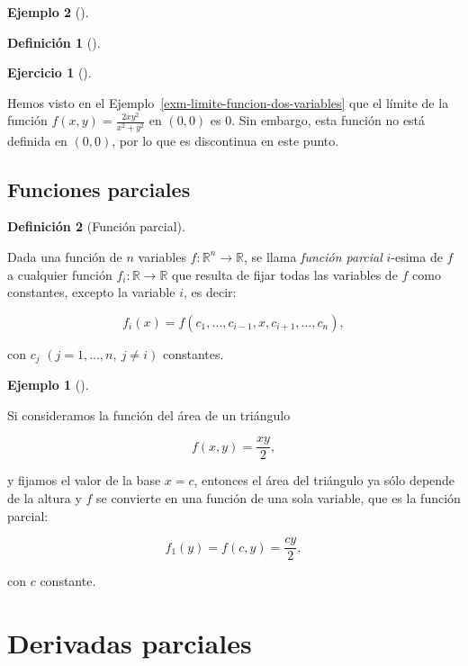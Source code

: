 \documentclass[
  a4paper,
]{scrreport}
\theoremstyle{definition}
\newtheorem{example}{Ejemplo}[chapter]
\theoremstyle{plain}
\theoremstyle{definition}
\newtheorem{definition}{Definición}[chapter]
\theoremstyle{definition}
\newtheorem{exercise}{Ejercicio}[chapter]
\theoremstyle{plain}
\theoremstyle{plain}
\theoremstyle{remark}
\begin{document}
\begin{example}[]
\begin{definition}[]
\end{definition}

\begin{exercise}[]\protect\hypertarget{exr-funcion-varias-variables-discontinua}{}\label{exr-funcion-varias-variables-discontinua}

Hemos visto en el Ejemplo~\ref{exm-limite-funcion-dos-variables} que el
límite de la función \(f(x,y)=\frac{2xy^2}{x^2+y^2}\) en \((0,0)\) es
\(0\). Sin embargo, esta función no está definida en \((0,0)\), por lo
que es discontinua en este punto.

\end{exercise}

\subsection{Funciones parciales}\label{funciones-parciales}

\begin{definition}[Función
parcial]\protect\hypertarget{def-funcion-parcial}{}\label{def-funcion-parcial}

Dada una función de \(n\) variables
\(f:\mathbb{R}^n\rightarrow \mathbb{R}\), se llama \emph{función
parcial} \(i\)-esima de \(f\) a cualquier función
\(f_i:\mathbb{R}\rightarrow \mathbb{R}\) que resulta de fijar todas las
variables de \(f\) como constantes, excepto la variable \(i\), es decir:

\[f_i(x)=f(c_1,\ldots,c_{i-1},x,c_{i+1},\ldots,c_{n}),\]

con \(c_j\) \((j=1,\ldots, n,\ j\neq i)\) constantes.

\end{definition}

\begin{example}[]\protect\hypertarget{exm-funcion-parcial}{}\label{exm-funcion-parcial}

Si consideramos la función del área de un triángulo

\[f(x,y)=\frac{xy}{2},\]

y fijamos el valor de la base \(x=c\), entonces el área del triángulo ya
sólo depende de la altura y \(f\) se convierte en una función de una
sola variable, que es la función parcial:

\[
f_1(y)=f(c,y)=\frac{cy}{2},
\]

con \(c\) constante.

\end{example}

\section{Derivadas parciales}\label{derivadas-parciales}


\end{example}
\end{document}
